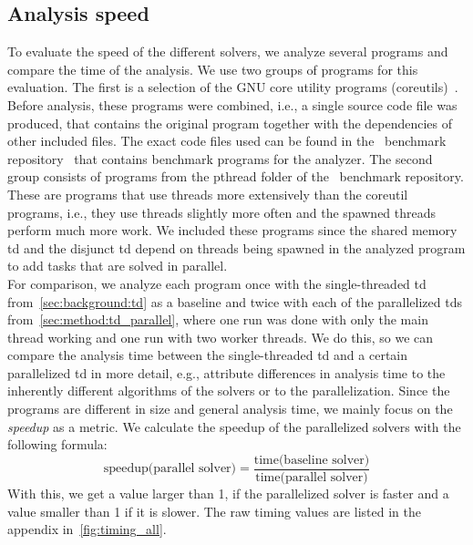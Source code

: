   \subsection{Analysis speed}
  \label{sec:eval:speed}
  To evaluate the speed of the different solvers, we analyze several programs and compare the time of the analysis. We use two groups of programs for this evaluation. The first is a selection of the GNU core utility programs (coreutils)~\cite{gnuCoreutils}. Before analysis, these programs were combined, i.e., a single source code file was produced, that contains the original program together with the dependencies of other included files. The exact code files used can be found in the \gob\ benchmark repository~\cite{goblintBench} that contains benchmark programs for the analyzer.
  The second group consists of programs from the pthread folder of the \gob\ benchmark repository. These are programs that use threads more extensively than the coreutil programs, i.e., they use threads slightly more often and the spawned threads perform much more work. We included these programs since the shared memory \ac{td} and the disjunct \ac{td} depend on threads being spawned in the analyzed program to add tasks that are solved in parallel.\\
  For comparison, we analyze each program once with the single-threaded \ac{td} from~\autoref{sec:background:td} as a baseline and twice with each of the parallelized \acp{td} from~\autoref{sec:method:td_parallel}, where one run was done with only the main thread working and one run with two worker threads. We do this, so we can compare the analysis time between the single-threaded \ac{td} and a certain parallelized \ac{td} in more detail, e.g., attribute differences in analysis time to the inherently different algorithms of the solvers or to the parallelization. Since the programs are different in size and general analysis time, we mainly focus on the \textit{speedup} as a metric. We calculate the speedup of the parallelized solvers with the following formula:
  \begin{equation*}
    \text{speedup(parallel solver)} = \frac{\text{time(baseline solver)}}{\text{time(parallel solver)}}
  \end{equation*}
  With this, we get a value larger than 1, if the parallelized solver is faster and a value smaller than 1 if it is slower. The raw timing values are listed in the appendix in~\autoref{fig:timing_all}.
